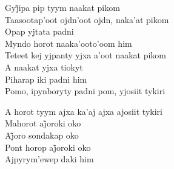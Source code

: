 \bigskip

\begin{linenumbers}
 
\noindent   Gyj̃ipa pip tyym naakat pikom\\
  Taasootap'oot ojdn'oot ojdn, naka'at pikom\\
  Opap yjtata padni\\
  Myndo horot naaka'ooto'oom him\\
  Teteet kej yjpanty yjxa a'oot naakat pikom\\
  A naakat yjxa tiokyt\\
  Piharap iki padni him\\
  Pomo, ipynboryty padni pom, yjosiit tykiri
 
\end{linenumbers}

\bigskip

\begin{linenumbers}
 
\noindent   A horot tyym ajxa ka'aj ajxa ajosiit tykiri\\
  Mahorot aj̃oroki oko\\
  Aj̃oro sondakap oko\\
  Pont horop aj̃oroki oko\\
  Ajpyrym'ewep daki him
 
\end{linenumbers}

\bigskip

